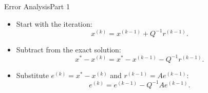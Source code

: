 \documentclass[10pt]{beamer}
\begin{document}



\begin{frame}{Error Analysis}{Part 1}

\begin{itemize}
    \item Start with the iteration:
    \[
        x^{(k)}=x^{(k-1)}+Q^{-1}r^{(k-1)}.
    \]

    \item Subtract from the exact solution:
    \[
        x^*-x^{(k)}
        =x^*-x^{(k-1)}-Q^{-1}r^{(k-1)}.
    \]

    \item Substitute $e^{(k)}=x^*-x^{(k)}$
    and $r^{(k-1)}=Ae^{(k-1)}$:
    \[
        e^{(k)}
        =e^{(k-1)}-Q^{-1}Ae^{(k-1)}.
    \]
\end{itemize}


\end{frame}
\end{document}
